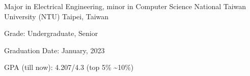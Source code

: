 

\begin{cventries}

  \cventry
  {Major in Electrical Engineering, minor in Computer Science} %
  {National Taiwan University (NTU)} %
  {Taipei, Taiwan} %
  {} %
  {
    \begin{cvitems} %
      \item {Grade: Undergraduate, Senior}
      \item {Graduation Date: January, 2023}
      \item {GPA (till now): 4.207/4.3 (top 5\% \textasciitilde 10\%)}
    \end{cvitems}
  }

\end{cventries}
